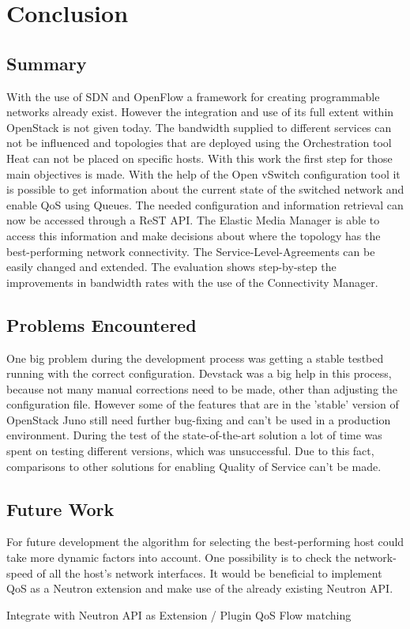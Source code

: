  \cleardoublepage
\chapter{Conclusion}

\section{Summary}

With the use of SDN and OpenFlow a framework for creating programmable networks already exist. However the integration and use of its full extent within OpenStack is not given today. The bandwidth supplied to different services can not be influenced and topologies that are deployed using the Orchestration tool Heat can not be placed on specific hosts. With this work the first step for those main objectives is made. With the help of the Open vSwitch configuration tool it is possible to get information about the current state of the switched network and enable QoS using Queues. The needed configuration and information retrieval can now be accessed through a ReST API. The Elastic Media Manager is able to access this information and make decisions about where the topology has the best-performing network connectivity. The Service-Level-Agreements can be easily changed and extended. The evaluation shows step-by-step the improvements in bandwidth rates with the use of the Connectivity Manager.

\section{Problems Encountered}

One big problem during the development process was getting a stable testbed running with the correct configuration. Devstack was a big help in this process, because not many manual corrections need to be made, other than adjusting the configuration file. However some of the features that are in the 'stable' version of OpenStack Juno still need further bug-fixing and can't be used in a production environment. During the test of the state-of-the-art solution a lot of time was spent on testing different versions, which was unsuccessful. Due to this fact, comparisons to other solutions for enabling Quality of Service can't be made. 

\section{Future Work}

For future development the algorithm for selecting the best-performing host could take more dynamic factors into account. One possibility is to check the network-speed of all the host's network interfaces. It would be beneficial to implement QoS as a Neutron extension and make use of the already existing Neutron API. 

Integrate with Neutron API as Extension / Plugin
QoS Flow matching